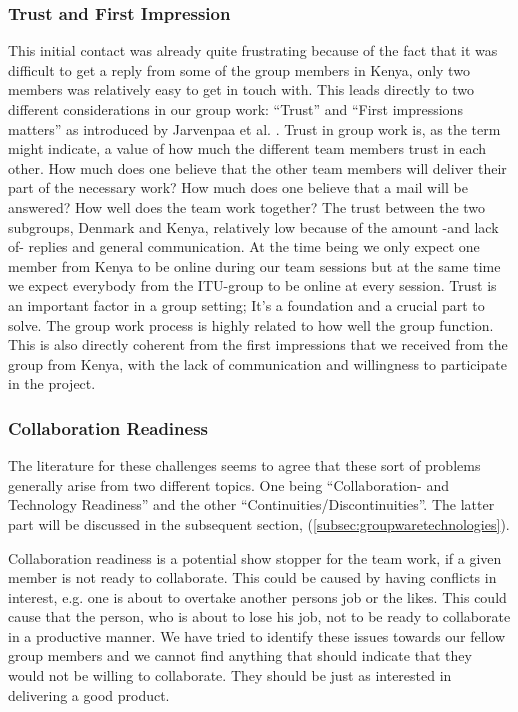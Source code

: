 \subsubsection{Trust and First Impression} \label{subsubsec:trustandfirstimpressions}
This initial contact was already quite frustrating because of the fact that it was difficult to get a reply from some of the group members in Kenya, only two members was relatively easy to get in touch with. This leads directly to two different considerations in our group work: ``Trust'' and ``First impressions matters'' as introduced by Jarvenpaa et al. \cite{jarvenpaa1998communication}. Trust in group work is, as the term might indicate, a value of how much the different team members trust in each other. How much does one believe that the other team members will deliver their part of the necessary work? How much does one believe that a mail will be answered? How well does the team work together? The trust between the two subgroups, Denmark and Kenya, relatively low because of the amount -and lack of- replies and general communication. At the time being we only expect one member from Kenya to be online during our team sessions but at the same time we expect everybody from the ITU-group to be online at every session. Trust is an important factor in a group setting; It's a foundation and a crucial part to solve. The group work process is highly related to how well the group function. This is also directly coherent from the first impressions that we received from the group from Kenya, with the lack of communication and willingness to participate in the project. 

\subsubsection{Collaboration Readiness} \label{subsubsec:collaborationreadiness}
The literature for these challenges seems to agree that these sort of problems generally arise from two different topics. One being ``Collaboration- and Technology Readiness'' and the other ``Continuities/Discontinuities''. The latter part will be discussed in the subsequent section,  (\ref{subsec:groupwaretechnologies}).

Collaboration readiness is a potential show stopper for the team work, if a given member is not ready to collaborate. This could be caused by having conflicts in interest, e.g. one is about to overtake another persons job or the likes. This could cause that the person, who is about to lose his job, not to be ready to collaborate in a productive manner. We have tried to identify these issues towards our fellow group members and we cannot find anything that should indicate that they would not be willing to collaborate. They should be just as interested in delivering a good product. 

